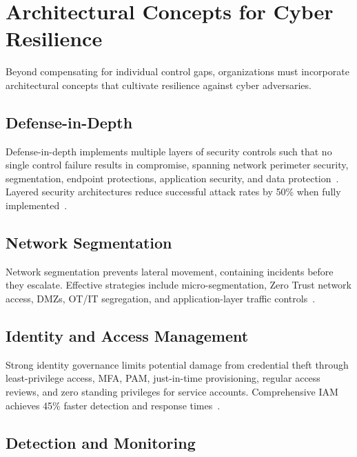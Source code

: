 \documentclass[sigconf,nonacm]{acmart}
\begin{document}
\section{Architectural Concepts for Cyber Resilience}

Beyond compensating for individual control gaps, organizations must incorporate
architectural concepts that cultivate resilience against cyber adversaries.

\subsection{Defense-in-Depth}

Defense-in-depth implements multiple layers of security controls such that no single
control failure results in compromise, spanning network perimeter security, segmentation,
endpoint protections, application security, and data protection~\cite{nist2021resilience}.
Layered security architectures reduce successful attack rates by 50\% when fully
implemented~\cite{zeronetworks2024}.

\subsection{Network Segmentation}

Network segmentation prevents lateral movement, containing incidents before they
escalate. Effective strategies include micro-segmentation, Zero Trust network access,
DMZs, OT/IT segregation, and application-layer traffic
controls~\cite{zeronetworks2024,rockwell2024}.

\subsection{Identity and Access Management}

Strong identity governance limits potential damage from credential theft through
least-privilege access, MFA, PAM, just-in-time provisioning, regular access reviews,
and zero standing privileges for service accounts. Comprehensive IAM achieves 45\%
faster detection and response times~\cite{kelley2023,zeronetworks2024}.

\subsection{Detection and Monitoring}
\end{document}
